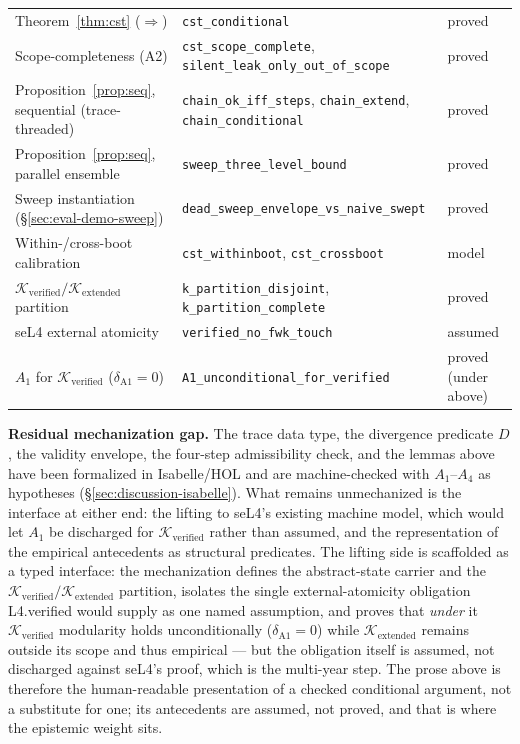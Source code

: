 \documentclass[conference]{IEEEtran}
\newcommand{\Kverified}{\mathcal{K}_\text{verified}}
\newcommand{\Kextended}{\mathcal{K}_\text{extended}}
\begin{document}
\begin{table}[t]
\begin{tabular}{@{}lll@{}}
Theorem~\ref{thm:cst} ($\Rightarrow$) & \texttt{cst\_conditional} & proved \\
Scope-completeness (A2) & \texttt{cst\_scope\_complete}, \texttt{silent\_leak\_only\_out\_of\_scope} & proved \\
Proposition~\ref{prop:seq}, sequential (trace-threaded) & \texttt{chain\_ok\_iff\_steps}, \texttt{chain\_extend}, \texttt{chain\_conditional} & proved \\
Proposition~\ref{prop:seq}, parallel ensemble & \texttt{sweep\_three\_level\_bound} & proved \\
Sweep instantiation (\S\ref{sec:eval-demo-sweep}) & \texttt{dead\_sweep\_envelope\_vs\_naive\_swept} & proved \\
Within-/cross-boot calibration & \texttt{cst\_withinboot}, \texttt{cst\_crossboot} & model \\
$\Kverified/\Kextended$ partition & \texttt{k\_partition\_disjoint}, \texttt{k\_partition\_complete} & proved \\
seL4 external atomicity & \texttt{verified\_no\_fwk\_touch} & assumed \\
$A_1$ for $\Kverified$ ($\delta_{\text{A1}}{=}0$) & \texttt{A1\_unconditional\_for\_verified} & proved (under above) \\
\bottomrule
\end{tabular}
\end{table}

\textbf{Residual mechanization gap.} The trace data type, the
divergence predicate $D$, the validity envelope, the four-step
admissibility check, and the lemmas above have been formalized in
Isabelle/HOL and are machine-checked with $A_1$--$A_4$ as
hypotheses (\S\ref{sec:discussion-isabelle}). What remains
unmechanized is the interface at either end: the lifting to seL4's
existing machine model, which would let $A_1$ be discharged for
$\Kverified$ rather than assumed, and the representation of the
empirical antecedents as structural predicates. The lifting side is
scaffolded as a typed interface: the mechanization defines the
abstract-state carrier and the $\Kverified/\Kextended$ partition,
isolates the single external-atomicity obligation L4.verified would
supply as one named assumption, and proves that \emph{under} it
$\Kverified$ modularity holds unconditionally
($\delta_{\text{A1}}{=}0$) while $\Kextended$ remains outside its
scope and thus empirical --- but the obligation itself is assumed,
not discharged against seL4's proof, which is the multi-year step.
The prose above is therefore the human-readable presentation of a
checked conditional argument, not a substitute for one; its
antecedents are assumed, not proved, and that is where the
epistemic weight sits.
\end{document}
